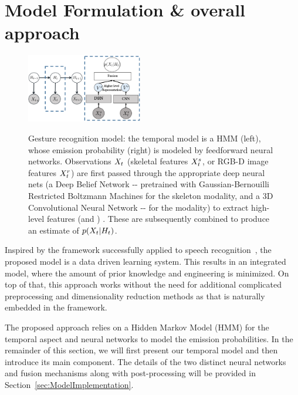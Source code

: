 

\section{Model Formulation \& overall approach}
\label{sec:approach}

\begin{figure}[t]
  \centering
  \includegraphics[width=0.45\textwidth]{images/GraphicalModel_new2}\\
  \caption{
 \small{ Gesture recognition model: the temporal model is a HMM (left), whose emission probability
\emissionprob{} (right) is modeled by feedforward neural networks.
Observations $X_t$ (skeletal features $X^{s}_t$, or RGB-D image features $X^{r}_t$)
are first passed through the appropriate deep neural nets (a Deep Belief Network -\DBN- pretrained with Gaussian-Bernouilli Restricted Boltzmann Machines
for the skeleton modality, and
 a 3D Convolutional Neural Network -\ThreeDCNN- for the \RGBD  modality) to extract high-level features (\highSK and \highRGBD)
. These are subsequently combined to produce an estimate of $p(X_t|H_t)$.
}}
\label{fig:GM}
\end{figure}

Inspired by the framework successfully applied to speech recognition~\cite{mohamed2012acoustic}, the proposed model is a data driven learning system. This results in an integrated model, where the amount of prior knowledge and engineering is minimized. On top of that, this approach works without the need for additional complicated preprocessing and dimensionality reduction methods as that is naturally embedded in the framework.

The proposed approach relies on a Hidden Markov Model (HMM) for the temporal aspect
and neural networks to model the emission probabilities.
 In the remainder of this section, we will first present our temporal model and then introduce its main component.
The details of the two distinct neural networks and fusion mechanisms along with post-processing will be provided
in Section~\ref{sec:ModelImplementation}.


